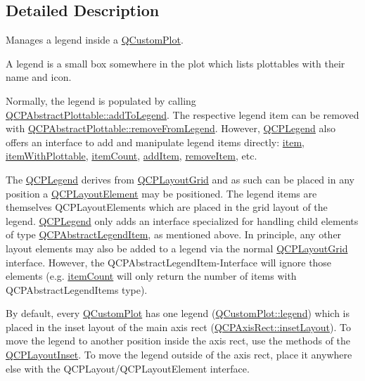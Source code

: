 \subsection{Detailed Description}
Manages a legend inside a \hyperlink{class_q_custom_plot}{Q\+Custom\+Plot}. 

A legend is a small box somewhere in the plot which lists plottables with their name and icon.

Normally, the legend is populated by calling \hyperlink{class_q_c_p_abstract_plottable_a70f8cabfd808f7d5204b9f18c45c13f5}{Q\+C\+P\+Abstract\+Plottable\+::add\+To\+Legend}. The respective legend item can be removed with \hyperlink{class_q_c_p_abstract_plottable_aa1f350e510326d012b9a9c9249736c83}{Q\+C\+P\+Abstract\+Plottable\+::remove\+From\+Legend}. However, \hyperlink{class_q_c_p_legend}{Q\+C\+P\+Legend} also offers an interface to add and manipulate legend items directly\+: \hyperlink{class_q_c_p_legend_a454272d7094437beb3278a2294006da5}{item}, \hyperlink{class_q_c_p_legend_a5ee80cf83f65e3b6dd386942ee3cc1ee}{item\+With\+Plottable}, \hyperlink{class_q_c_p_legend_a198228e9cdc78d3a3c306fa6763d0404}{item\+Count}, \hyperlink{class_q_c_p_legend_a3ab274de52d2951faea45a6d975e6b3f}{add\+Item}, \hyperlink{class_q_c_p_legend_ac91595c3eaa746fe6321d2eb952c63bb}{remove\+Item}, etc.

The \hyperlink{class_q_c_p_legend}{Q\+C\+P\+Legend} derives from \hyperlink{class_q_c_p_layout_grid}{Q\+C\+P\+Layout\+Grid} and as such can be placed in any position a \hyperlink{class_q_c_p_layout_element}{Q\+C\+P\+Layout\+Element} may be positioned. The legend items are themselves Q\+C\+P\+Layout\+Elements which are placed in the grid layout of the legend. \hyperlink{class_q_c_p_legend}{Q\+C\+P\+Legend} only adds an interface specialized for handling child elements of type \hyperlink{class_q_c_p_abstract_legend_item}{Q\+C\+P\+Abstract\+Legend\+Item}, as mentioned above. In principle, any other layout elements may also be added to a legend via the normal \hyperlink{class_q_c_p_layout_grid}{Q\+C\+P\+Layout\+Grid} interface. However, the Q\+C\+P\+Abstract\+Legend\+Item-\/\+Interface will ignore those elements (e.\+g. \hyperlink{class_q_c_p_legend_a198228e9cdc78d3a3c306fa6763d0404}{item\+Count} will only return the number of items with Q\+C\+P\+Abstract\+Legend\+Items type).

By default, every \hyperlink{class_q_custom_plot}{Q\+Custom\+Plot} has one legend (\hyperlink{class_q_custom_plot_a4eadcd237dc6a09938b68b16877fa6af}{Q\+Custom\+Plot\+::legend}) which is placed in the inset layout of the main axis rect (\hyperlink{class_q_c_p_axis_rect_a4114887c7141b59650b7488f930993e5}{Q\+C\+P\+Axis\+Rect\+::inset\+Layout}). To move the legend to another position inside the axis rect, use the methods of the \hyperlink{class_q_c_p_layout_inset}{Q\+C\+P\+Layout\+Inset}. To move the legend outside of the axis rect, place it anywhere else with the Q\+C\+P\+Layout/\+Q\+C\+P\+Layout\+Element interface. 


